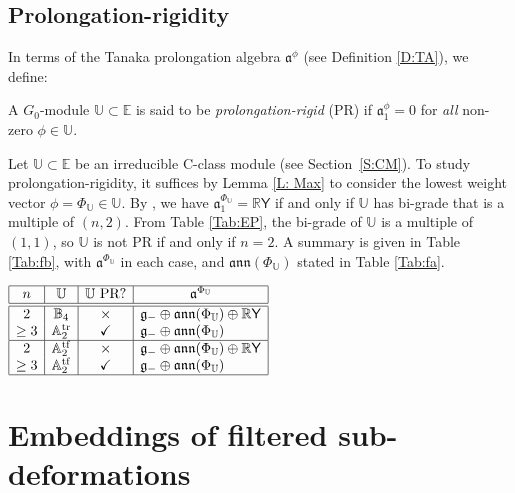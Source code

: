 \documentclass[pdftex]{sigma}%
\DeclareMathOperator{\tf}{tf}
\DeclareMathOperator{\tr}{tr}
\newcommand{\g}{\mathfrak{g}}
\newcommand\fa{\mathfrak{a}}
\newcommand\fann{\mathfrak{ann}}
\newcommand{\R}{\mathbb{R}}
\newcommand\bbE{\mathbb{E}}
\newcommand\bbU{\mathbb{U}}
\newcommand\bbA{\mathbb{A}}
\newcommand\bbB{\mathbb{B}}
\newcommand\sfY{\mathsf{Y}}
\numberwithin{equation}{section}
\begin{document}
\subsection{Prolongation-rigidity}\label{S:PR}
In terms of the Tanaka prolongation algebra $\fa^\phi$ (see Definition \ref{D:TA}), we define:
\begin{Definition}\label{D:PR}
A $G_0$-module $\bbU \subset \bbE$ is said to be {\em prolongation-rigid} (PR) if $\fa_1^\phi = 0$ for {\em all} non-zero $\phi \in \bbU$.
\end{Definition}

Let $\bbU \subset \bbE$ be an irreducible C-class module (see Section~\ref{S:CM}). To study prolongation-rigidity, it suffices by Lemma \ref{L: Max} to consider the lowest weight vector $\phi = \Phi_\bbU \in \bbU$. By \cite[Lemma~3.3]{KT2021}, we have $\fa^{\Phi_\bbU}_1 = \R \sfY$ if and only if $\bbU$ has bi-grade that is a multiple of $(n,2)$. From Table \ref{Tab:EP}, the bi-grade of $\bbU$ is a multiple of $(1,1)$, so $\bbU$ is not PR if and only if $n=2$. A summary is given in Table \ref{Tab:fb}, with $\fa^{\Phi_\bbU}$ in each case, and $\fann(\Phi_\bbU)$ stated in Table \ref{Tab:fa}.

\begin{table}[ht!]\renewcommand{\arraystretch}{1.15}
\centering
$\begin{array}{|c|c|c|l|} \hline
n & \bbU & \bbU \text{ PR?} & \multicolumn{1}{c|}{\fa^{\Phi_\bbU}}\\ \hline\hline
2 & \bbB_4 &\times & \g_{-} \oplus \fann (\Phi_\bbU) \oplus \R\sfY\\
\ge 3 & \bbA_2^{\tr}&\checkmark & \g_{-} \oplus \fann (\Phi_\bbU) \\ \hline
2 & \bbA_2^{\tf} & \times & \g_{-} \oplus \fann (\Phi_\bbU) \oplus \R\sfY \\
\ge 3&\bbA_2^{\tf} &\checkmark & \g_{-} \oplus \fann (\Phi_\bbU) \\ \hline
\end{array}$
\caption{Prolongation-rigidity for irreducible C-class modules $\bbU \subset \bbE$.}\label{Tab:fb}
\vspace{-1mm}
\end{table}

\section{Embeddings of filtered sub-deformations} \label{S:Embed}
\end{document}
